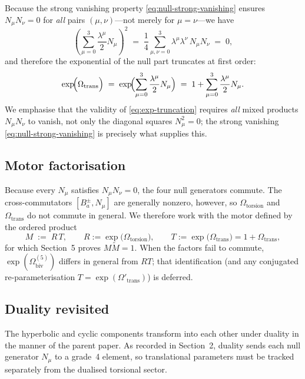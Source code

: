 \documentclass[dvipdfmx,a4paper]{article}
\theoremstyle{definition}
\theoremstyle{plain}
\theoremstyle{remark}
\begin{document}
Because the strong vanishing property \eqref{eq:null-strong-vanishing} ensures \(N_{\mu}N_{\nu}=0\) for \emph{all} pairs \((\mu,\nu)\)---not merely for \(\mu=\nu\)---we have
\begin{equation}
\left(\sum_{\mu=0}^{3}\frac{\lambda^{\mu}}{2}N_{\mu}\right)^{\!\!2}
\;=\;\frac{1}{4}\sum_{\mu,\nu=0}^{3}\lambda^{\mu}\lambda^{\nu}\,N_{\mu}N_{\nu}
\;=\;0,
\end{equation}
and therefore the exponential of the null part truncates at first order:
\begin{equation}
\exp\!\Bigl( \Omega_{\text{trans}} \Bigr)
\;=\;\exp\!\Bigl(\sum_{\mu=0}^{3}\frac{\lambda^{\mu}}{2}N_{\mu}\Bigr)
\;=\;1+\sum_{\mu=0}^{3}\frac{\lambda^{\mu}}{2}N_{\mu}.
\label{eq:exp-truncation}
\end{equation}
We emphasise that the validity of \eqref{eq:exp-truncation} requires \emph{all} mixed products \(N_{\mu}N_{\nu}\) to vanish, not only the diagonal squares \(N_{\mu}^{2}=0\); the strong vanishing \eqref{eq:null-strong-vanishing} is precisely what supplies this.

\subsection{Motor factorisation}

Because every \(N_{\mu}\) satisfies \(N_{\mu}N_{\nu}=0\), the four null generators commute. The cross-commutators \([B_{a}^{\pm},N_{\mu}]\) are generally nonzero, however, so \(\Omega_{\text{torsion}}\) and \(\Omega_{\text{trans}}\) do not commute in general. We therefore work with the motor defined by the ordered product
\begin{equation}
M \;:=\; R\,T,
\qquad
R := \exp\!\bigl(\Omega_{\text{torsion}}\bigr),\qquad
T := \exp\!\bigl(\Omega_{\text{trans}}\bigr)=1+\Omega_{\text{trans}},
\end{equation}
for which Section~5 proves \(M\widetilde{M}=1\). When the factors fail to commute, \(\exp(\Omega_{\text{biv}}^{(5)})\) differs in general from \(RT\); that identification (and any conjugated re-parameterisation \(T=\exp(\Omega'_{\text{trans}})\)) is deferred.

\subsection{Duality revisited}

The hyperbolic and cyclic components transform into each other under duality in the manner of the parent paper. As recorded in Section~2, duality sends each null generator \(N_{\mu}\) to a grade~4 element, so translational parameters must be tracked separately from the dualised torsional sector.
\end{document}
